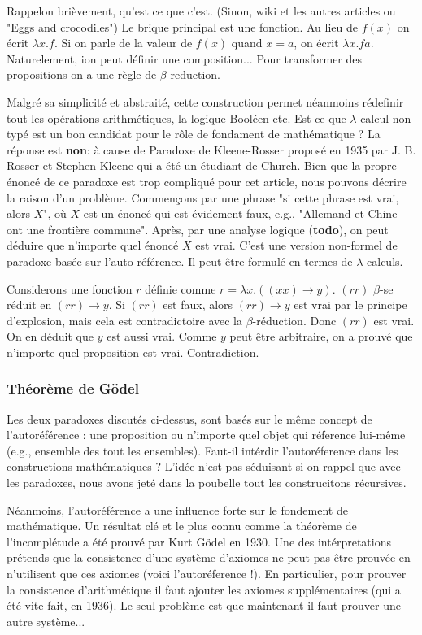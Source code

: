 \documentclass[12pt, a4paper]{article}
\begin{document}
Rappelon brièvement, qu'est ce que c'est. (Sinon, wiki et les autres articles ou "Eggs and crocodiles")
Le brique principal est une fonction. 
Au lieu de $f(x)$ on écrit $\lambda x.f$.
Si on parle de la valeur de $f(x)$ quand $x=a$, on écrit $\lambda x.f a$.
Naturelement, ion peut définir une composition...
Pour transformer des propositions on a une règle de $\beta$-reduction.

Malgré sa simplicité et abstraité, cette construction permet néanmoins rédefinir tout les opérations arithmétiques, la logique Booléen etc.
Est-ce que $\lambda$-calcul non-typé est un bon candidat pour le rôle de fondament de mathématique ?
La réponse est \textbf{non}: à cause de Paradoxe de Kleene-Rosser proposé en 1935 par J. B. Rosser et Stephen Kleene qui a été un étudiant de Church.
Bien que la propre énoncé de ce paradoxe est trop compliqué pour cet article, nous pouvons décrire la raison d'un problème.
Commençons par une phrase "si cette phrase est vrai, alors $X$", où $X$ est un énoncé qui est évidement faux, e.g., "Allemand et Chine ont une frontière commune".
Après, par une analyse logique (\textbf{todo}), on peut déduire que n'importe quel énoncé $X$ est vrai.
C'est une version non-formel de paradoxe basée sur l'auto-référence.
Il peut être formulé en termes de $\lambda$-calculs.

{\footnotesize
	Considerons une fonction $r$ définie comme $r=\lambda x.((x x) \to y)$.
	$(r r)$ $\beta$-se réduit en $(r r) \to y$.
	Si $(r r)$ est faux, alors $(r r) \to y$ est vrai par le principe d'explosion, mais cela est contradictoire avec la $\beta$-réduction.
	Donc $(r r)$ est vrai.
	On en déduit que $y$ est aussi vrai.
	Comme $y$ peut être arbitraire, on a prouvé que n'importe quel proposition est vrai.
	Contradiction.
}

\subsubsection*{Théorème de Gödel}
Les deux paradoxes discutés ci-dessus, sont basés sur le même concept de l'autoréférence : une proposition ou n'importe quel objet qui réference lui-même (e.g., ensemble des tout les ensembles).
Faut-il intérdir l'autoréference dans les constructions mathématiques ?
L'idée n'est pas séduisant si on rappel que avec les paradoxes, nous avons jeté dans la poubelle tout les construcitons récursives.

Néanmoins, l'autoréférence a une influence forte sur le fondement de mathématique.
Un résultat clé et le plus connu comme la théorème de l'incomplétude a été prouvé par Kurt Gödel en 1930.
Une des intérpretations prétends que la consistence d'une système d'axiomes ne peut pas être prouvée en n'utilisent que ces axiomes (voici l'autoréference !). En particulier, pour prouver la consistence d'arithmétique il faut ajouter les axiomes supplémentaires (qui a été vite fait, en 1936). Le seul problème est que maintenant il faut prouver une autre système...
\end{document}
